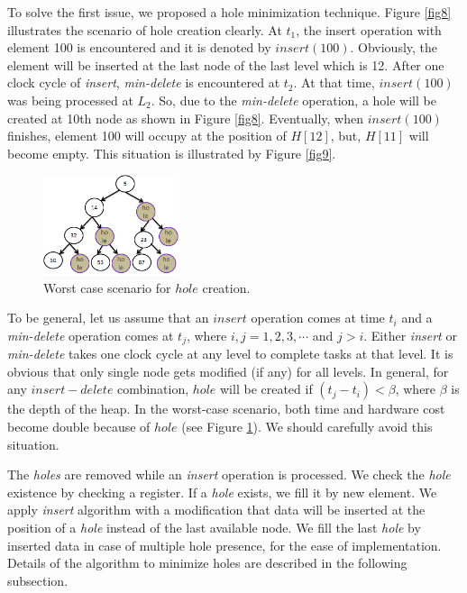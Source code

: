 \documentclass[10pt, conference, compsocconf]{IEEEtran}
\begin{document}
To solve the first issue, we proposed a hole minimization technique.
Figure \ref{fig8} illustrates the scenario of hole creation clearly.
At $t_1$, the insert operation with element 100 is encountered and it is denoted by $insert(100)$.
Obviously, the element will be inserted at the last node of the last level which is 12.
After one clock cycle of {\it insert}, {\it min-delete} is encountered at $t_2$.
At that time, $insert(100)$ was being processed at $L_2$.
So, due to the {\it min-delete} operation, a hole will be created at 10th node as shown in Figure \ref{fig8}.
Eventually, when $insert(100)$ finishes, element 100 will occupy at the position of $H[12]$, but, $H[11]$ will become empty. This situation is illustrated by Figure \ref{fig9}.

\begin{figure}[!ht]
  \centering
  \includegraphics[width=4cm]{Figures/hole.png}
      \caption{Worst case scenario for $hole$ creation.}
    \label{hole}
\end{figure}

To be general, let us assume that an $insert$ operation comes at time $t_i$ and a {\it min-delete} operation comes at $t_j$, where $i, j = 1,2,3, \cdots$ and $j>i$.
Either {\it insert} or {\it min-delete} takes one clock cycle at any level to complete tasks at that level.
It is obvious that only single node gets modified (if any) for all levels.
In general, for any $insert-delete$ combination, $hole$ will be created if $(t_j - t_i) < \beta$, where $\beta$ is the depth of the heap.
In the worst-case scenario, both time and hardware cost become double because of $hole$ (see Figure \ref{hole}). We should carefully avoid this situation.

The {\it holes} are removed while an {\it insert} operation is processed.
We check the {\it hole} existence by checking a register.
If a {\it hole} exists, we fill it by new element. We apply {\it insert} algorithm with a modification that data will be inserted at the position of a {\it hole} instead of the last available node. We fill the last {\it hole} by inserted data in case of multiple hole presence, for the ease of implementation.
Details of the algorithm to minimize holes are described in the following subsection.
\end{document}
